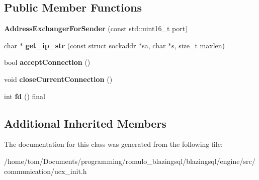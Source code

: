 \subsection*{Public Member Functions}
\begin{DoxyCompactItemize}
\item 
\mbox{\label{classral_1_1communication_1_1AddressExchangerForSender_aed8329980dcfef4c782e0cd5cc23bc22}} 
{\bfseries Address\+Exchanger\+For\+Sender} (const std\+::uint16\+\_\+t port)
\item 
\mbox{\label{classral_1_1communication_1_1AddressExchangerForSender_a90dff593f2b306ceb94940e213fda0bd}} 
char $\ast$ {\bfseries get\+\_\+ip\+\_\+str} (const struct sockaddr $\ast$sa, char $\ast$s, size\+\_\+t maxlen)
\item 
\mbox{\label{classral_1_1communication_1_1AddressExchangerForSender_aca2eb6acefb439cd8d3b898d19d54d22}} 
bool {\bfseries accept\+Connection} ()
\item 
\mbox{\label{classral_1_1communication_1_1AddressExchangerForSender_a5a2e5c7a53c81f6425aaaa4821f378ed}} 
void {\bfseries close\+Current\+Connection} ()
\item 
\mbox{\label{classral_1_1communication_1_1AddressExchangerForSender_adaf94458ab22f538905644ff818be6f4}} 
int {\bfseries fd} () final
\end{DoxyCompactItemize}
\subsection*{Additional Inherited Members}


The documentation for this class was generated from the following file\+:\begin{DoxyCompactItemize}
\item 
/home/tom/\+Documents/programming/romulo\+\_\+blazingsql/blazingsql/engine/src/communication/ucx\+\_\+init.\+h\end{DoxyCompactItemize}

